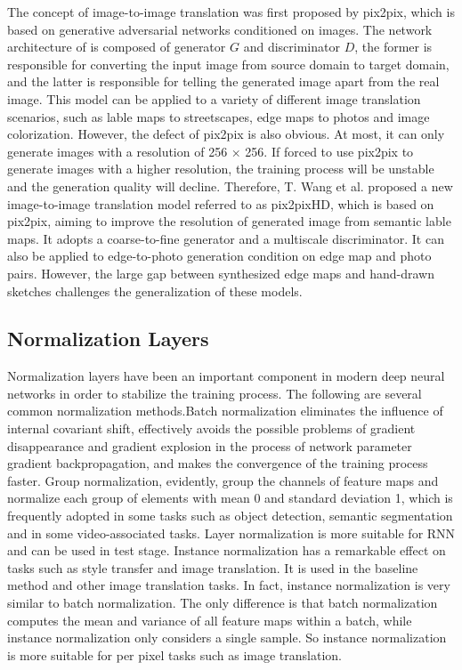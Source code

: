 \documentclass[10pt,twocolumn,letterpaper]{article}
\begin{document}
The concept of image-to-image translation was first proposed by pix2pix\cite{pix2pix}, which is based on generative adversarial networks conditioned on images. The network architecture of \cite{pix2pix} is composed of generator $G$ and discriminator $D$, the former is responsible for converting the input image from source domain to target domain, and the latter is responsible for telling the generated image apart from the real image. This model can be applied to a variety of different image translation scenarios, such as lable maps to streetscapes, edge maps to photos and image colorization.
However, the defect of pix2pix is also obvious. At most, it can only generate images with a resolution of 256 × 256. If forced to use pix2pix to generate images with a higher resolution, the training process will be unstable and the generation quality will decline. Therefore, T. Wang et al. proposed a new image-to-image translation model referred to as pix2pixHD\cite{pix2pixhd}, which is based on pix2pix, aiming to improve the resolution of generated image from semantic lable maps. It adopts a coarse-to-fine generator and a multiscale discriminator. It can also be applied to edge-to-photo generation condition on edge map and photo pairs. However, the large gap between synthesized edge maps and hand-drawn sketches challenges the generalization of these models.

\subsection{Normalization Layers}
Normalization layers have been an important component in modern deep neural networks in order to stabilize the training process. The following are several common normalization methods.Batch normalization\cite{bn} eliminates the influence of internal covariant shift, effectively avoids the possible problems of gradient disappearance and gradient explosion in the process of network parameter gradient backpropagation, and makes the convergence of the training process faster. Group normalization\cite{gn}, evidently, group the channels of feature maps and normalize each group of elements with mean 0 and standard deviation 1, which is frequently adopted in some tasks such as object detection, semantic segmentation and in some video-associated tasks. Layer normalization\cite{ln} is more suitable for RNN and can be used in test stage. Instance normalization\cite{instance_norm} has a remarkable effect on tasks such as style transfer and image translation. It is used in the baseline method\cite{pix2pixhd} and other image translation tasks\cite{spade,cyclegan}. In fact, instance normalization is very similar to batch normalization. The only difference is that batch normalization computes the mean and variance of all feature maps within a batch, while instance normalization only considers a single sample. So instance normalization is more suitable for per pixel tasks such as image translation.
\end{document}
